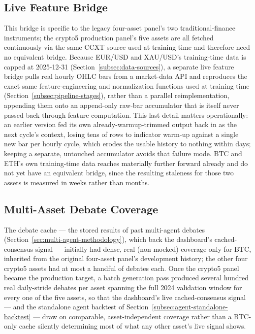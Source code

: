\subsection{Live Feature Bridge}
\label{subsec:dashboard-live-bridge}

This bridge is specific to the legacy four-asset panel's two traditional-finance instruments; the crypto5 production panel's five assets are all fetched continuously via the same CCXT source used at training time and therefore need no equivalent bridge. Because EUR/USD and XAU/USD's training-time data is capped at 2025-12-31 (Section~\ref{subsec:data-sources}), a separate live feature bridge pulls real hourly OHLC bars from a market-data API and reproduces the exact same feature-engineering and normalization functions used at training time (Section~\ref{subsec:pipeline-stages}), rather than a parallel reimplementation, appending them onto an append-only raw-bar accumulator that is itself never passed back through feature computation. This last detail matters operationally: an earlier version fed its own already-warmup-trimmed output back in as the next cycle's context, losing tens of rows to indicator warm-up against a single new bar per hourly cycle, which erodes the usable history to nothing within days; keeping a separate, untouched accumulator avoids that failure mode. BTC and ETH's own training-time data reaches materially further forward already and do not yet have an equivalent bridge, since the resulting staleness for those two assets is measured in weeks rather than months.

\subsection{Multi-Asset Debate Coverage}
\label{subsec:dashboard-debate-coverage}

The debate cache --- the stored results of past multi-agent debates (Section~\ref{sec:multi-agent-methodology}), which back the dashboard's cached-consensus signal --- initially had dense, real (non-mocked) coverage only for BTC, inherited from the original four-asset panel's development history; the other four crypto5 assets had at most a handful of debates each. Once the crypto5 panel became the production target, a batch generation pass produced several hundred real daily-stride debates per asset spanning the full 2024 validation window for every one of the five assets, so that the dashboard's live cached-consensus signal --- and the standalone agent backtest of Section~\ref{subsec:agent-standalone-backtest} --- draw on comparable, asset-independent coverage rather than a BTC-only cache silently determining most of what any other asset's live signal shows.

